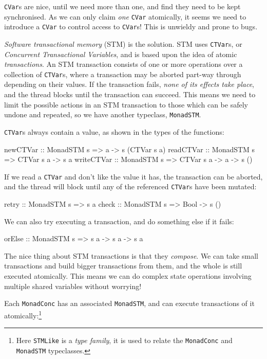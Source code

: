 \verb|CVar|s are nice, until we need more than one, and find they need
to be kept synchronised. As we can only claim \emph{one} \verb|CVar|
atomically, it seems we need to introduce a \verb|CVar| to control
access to \verb|CVar|s! This is unwieldy and prone to bugs.

\emph{Software transactional memory} (STM) is the solution. STM uses
\verb|CTVar|s, or \emph{Concurrent Transactional Variables}, and is
based upon the idea of atomic \emph{transactions}. An STM transaction
consists of one or more operations over a collection of \verb|CTVar|s,
where a transaction may be aborted part-way through depending on their
values. If the transaction fails, \emph{none of its effects take
  place}, and the thread blocks until the transaction can
succeed. This means we need to limit the possible actions in an STM
transaction to those which can be safely undone and repeated, so we
have another typeclass, \verb|MonadSTM|.

\verb|CTVar|s always contain a value, as shown in the types of the
functions:

\begin{haskellcode}
newCTVar   :: MonadSTM s => a -> s (CTVar s a)
readCTVar  :: MonadSTM s => CTVar s a -> s a
writeCTVar :: MonadSTM s => CTVar s a -> a -> s ()
\end{haskellcode}

If we read a \verb|CTVar| and don't like the value it has, the
transaction can be aborted, and the thread will block until any of the
referenced \verb|CTVar|s have been mutated:

\begin{haskellcode}
retry :: MonadSTM s => s a
check :: MonadSTM s => Bool -> s ()
\end{haskellcode}

We can also try executing a transaction, and do something else if it
fails:

\begin{haskellcode}
orElse :: MonadSTM s => s a -> s a -> s a
\end{haskellcode}

The nice thing about STM transactions is that they \emph{compose}. We
can take small transactions and build bigger transactions from them,
and the whole is still executed atomically. This means we can do
complex state operations involving multiple shared variables without
worrying!

Each \verb|MonadConc| has an associated \verb|MonadSTM|, and can
execute transactions of it atomically:\footnote{Here \texttt{STMLike}
  is a \emph{type family}, it is used to relate the \texttt{MonadConc}
  and \texttt{MonadSTM} typeclasses.}

